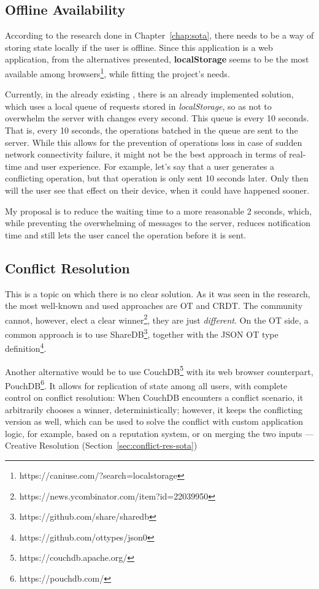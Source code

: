 \subsection{Offline Availability} \label{sec:prob-solution-offline-avail}
According to the research done in Chapter~\ref{chap:sota}, there needs to be a way of storing state locally if the user is offline. Since this application is a web application, from the alternatives presented, \textbf{localStorage} seems to be the most available among browsers\footnote{https://caniuse.com/?search=localstorage}, while fitting the project's needs. 

Currently, in the already existing , there is an already implemented solution, which uses a local queue of requests stored in \textit{localStorage}, so as not to overwhelm the server with changes every second. This queue is  every 10 seconds. That is, every 10 seconds, the operations batched in the queue are sent to the server. While this allows for the prevention of operations loss in case of sudden network connectivity failure, it might not be the best approach in terms of real-time and user experience. For example, let's say that a user generates a conflicting operation, but that operation is only sent 10 seconds later. Only then will the user see that effect on their device, when it could have happened sooner.

My proposal is to reduce the waiting time to a more reasonable 2 seconds, which, while preventing the overwhelming of messages to the server, reduces notification time and still lets the user cancel the operation before it is sent.

\subsection{Conflict Resolution} \label{sec:prob-solution-conflict-res}
This is a topic on which there is no clear solution. As it was seen in the research, the most well-known and used approaches are OT and CRDT. The community cannot, however, elect a clear winner\footnote{https://news.ycombinator.com/item?id=22039950}, they are just \textit{different}. On the OT side, a common approach is to use ShareDB\footnote{https://github.com/share/sharedb}, together with the JSON OT type definition\footnote{https://github.com/ottypes/json0}.

Another alternative would be to use CouchDB\footnote{https://couchdb.apache.org/} with its web browser counterpart, PouchDB\footnote{https://pouchdb.com/}. It allows for replication of state among all users, with complete control on conflict resolution: When CouchDB encounters a conflict scenario, it arbitrarily chooses a winner, deterministically; however, it keeps the conflicting version as well, which can be used to solve the conflict with custom application logic, for example, based on a reputation system, or on merging the two inputs --- Creative Resolution (Section~\ref{sec:conflict-res-sota})

